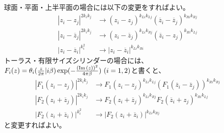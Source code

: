 球面・平面・上半平面の場合には以下の変更をすればよい。
\begin{align}
|z_i-z_j|^{2k_ik_j}&\to (z_i-z_j)^{k_{Li}k_{Lj}}(\overline{z}_i-\overline{z}_j)^{k_{Ri}k_{Rj}}\\
|z_i-\overline{z}_j|^{2k_ik_j}&\to (z_i-\overline{z}_j)^{k_{Li}k_{Rj}}(\overline{z}_i-z_j)^{k_{Ri}k_{Lj}}\\
|z_i-\overline{z}_i|^{k_i^2}&\to |z_i-\overline{z}_i|^{k_{Li}k_{Ri}}
\end{align}
トーラス・有限サイズシリンダーの場合には、$F_{i}(z)=\theta_{i}(\frac{z}{2\pi}|i\beta)\exp(-\frac{(\IM(z))^2}{4\pi\beta})\ (i=1,2)$と書くと、
\begin{align}
|F_1(z_i-z_j)|^{2k_ik_j}&\to F_1(z_i-z_j)^{k_{Li}k_{Lj}}(F_1(\overline{z}_i-\overline{z}_j))^{k_{Ri}k_{Rj}}\\
|F_2(z_i+\overline{z}_j)|^{2k_ik_j}&\to F_2(z_i+\overline{z}_j)^{k_{Li}k_{Rj}}F_2(\overline{z}_i+z_j)^{k_{Ri}k_{Lj}}\\
|F_2(z_i+\overline{z}_i)|^{k_i^2}&\to |F_2(z_i+\overline{z}_i)|^{k_{Li}k_{Rj}}
\end{align}
と変更すればよい。

